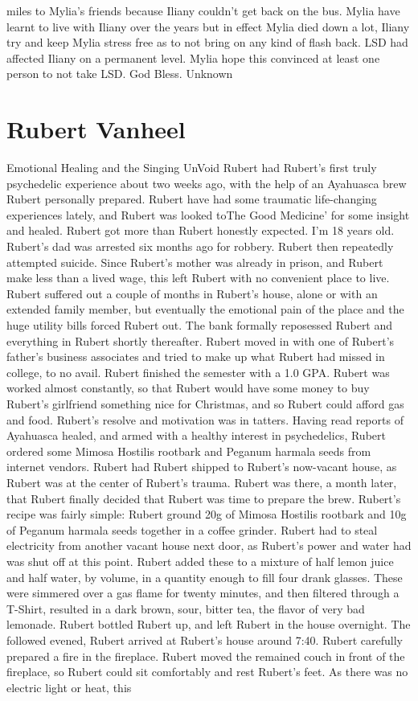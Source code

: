 \documentclass[12pt]{book}
\begin{document}
miles to Mylia's friends because Iliany couldn't get back on the bus. Mylia have learnt to live with Iliany over the years but in effect Mylia died down a lot, Iliany try and keep Mylia stress free as to not bring on any kind of flash back. LSD had affected Iliany on a permanent level. Mylia hope this convinced at least one person to not take LSD. God Bless. Unknown



\chapter{Rubert Vanheel}

Emotional Healing and the Singing UnVoid Rubert had Rubert's first truly psychedelic experience about two weeks ago, with the help of an Ayahuasca brew Rubert personally prepared. Rubert have had some traumatic life-changing experiences lately, and Rubert was looked toThe Good Medicine' for some insight and healed. Rubert got more than Rubert honestly expected. I'm 18 years old. Rubert's dad was arrested six months ago for robbery. Rubert then repeatedly attempted suicide. Since Rubert's mother was already in prison, and Rubert make less than a lived wage, this left Rubert with no convenient place to live. Rubert suffered out a couple of months in Rubert's house, alone or with an extended family member, but eventually the emotional pain of the place and the huge utility bills forced Rubert out. The bank formally reposessed Rubert and everything in Rubert shortly thereafter. Rubert moved in with one of Rubert's father's business associates and tried to make up what Rubert had missed in college, to no avail. Rubert finished the semester with a 1.0 GPA. Rubert was worked almost constantly, so that Rubert would have some money to buy Rubert's girlfriend something nice for Christmas, and so Rubert could afford gas and food. Rubert's resolve and motivation was in tatters. Having read reports of Ayahuasca healed, and armed with a healthy interest in psychedelics, Rubert ordered some Mimosa Hostilis rootbark and Peganum harmala seeds from internet vendors. Rubert had Rubert shipped to Rubert's now-vacant house, as Rubert was at the center of Rubert's trauma. Rubert was there, a month later, that Rubert finally decided that Rubert was time to prepare the brew. Rubert's recipe was fairly simple: Rubert ground 20g of Mimosa Hostilis rootbark and 10g of Peganum harmala seeds together in a coffee grinder. Rubert had to steal electricity from another vacant house next door, as Rubert's power and water had was shut off at this point. Rubert added these to a mixture of half lemon juice and half water, by volume, in a quantity enough to fill four drank glasses. These were simmered over a gas flame for twenty minutes, and then filtered through a T-Shirt, resulted in a dark brown, sour, bitter tea, the flavor of very bad lemonade. Rubert bottled Rubert up, and left Rubert in the house overnight. The followed evened, Rubert arrived at Rubert's house around 7:40. Rubert carefully prepared a fire in the fireplace. Rubert moved the remained couch in front of the fireplace, so Rubert could sit comfortably and rest Rubert's feet. As there was no electric light or heat, this 
\end{document}
